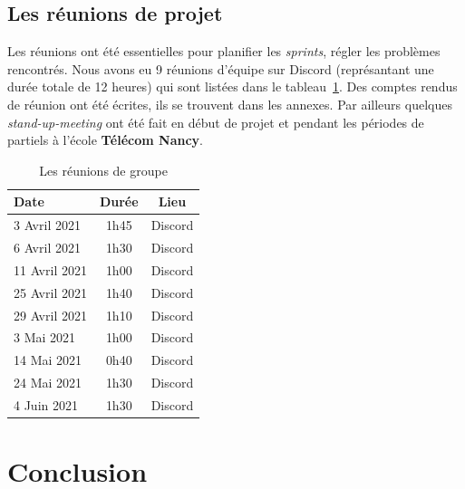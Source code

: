 \documentclass[12pt]{article}
\begin{document}
\subsection{Les réunions de projet}
Les réunions ont été essentielles pour planifier les \textsl{sprints}, régler les problèmes rencontrés. Nous avons eu 9 réunions d'équipe sur \textsf{Discord} (représantant une durée totale de 12 heures) qui sont listées dans le tableau~\ref{tab:reunions}. Des comptes rendus de réunion ont été écrites, ils se trouvent dans les annexes. Par ailleurs quelques \textsl{stand-up-meeting} ont été fait en début de projet et pendant les périodes de partiels à l'école \textbf{Télécom Nancy}.
\begin{table}[!h]
\begin{center}
    \begin{tabular}{|l|c|c|}
    \hline
        Date & Durée & Lieu\\
    \hline
    \hline
        3 Avril 2021 & 1h45 & Discord \\
    \hline
        6 Avril 2021 & 1h30 & Discord \\
    \hline
        11 Avril 2021 & 1h00 & Discord \\
    \hline
        25 Avril 2021 & 1h40 & Discord \\
    \hline
        29 Avril 2021 & 1h10 & Discord \\
    \hline
        3 Mai 2021 & 1h00 & Discord \\
    \hline
        14 Mai 2021 & 0h40 & Discord \\
    \hline
        24 Mai 2021 & 1h30 & Discord \\
    \hline
        4 Juin 2021 & 1h30 & Discord \\
    \hline
    \end{tabular}
\end{center}
\caption{Les réunions de groupe}
\label{tab:reunions}
\end{table}


\newpage

\section*{Conclusion}
    
\end{document}
